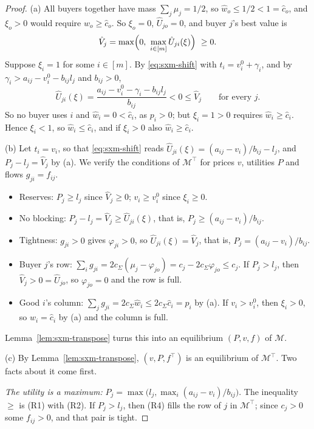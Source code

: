 \begin{proof}
(a) All buyers together have mass $\sum_j\mu_j=1/2$, so $\hat w_o\le1/2<1=\hat c_o$, and $\xi_o>0$ would
require $\hat w_o\ge\hat c_o$. So $\xi_o=0$, $\hat U_{jo}=0$, and buyer $j$'s best value is
\[
\hat V_j=\max\Bigl(0,\ \max_{i\in[m]}\hat U_{ji}(\xi)\Bigr)\ \ge0 .
\]
Suppose $\xi_i=1$ for some $i\in[m]$. By \eqref{eq:sxm-shift} with $t_i=v_i^0+\gamma_i$, and by
$\gamma_i>a_{ij}-v_i^0-b_{ij}l_j$ and $b_{ij}>0$,
\[
\hat U_{ji}(\xi)=\frac{a_{ij}-v_i^0-\gamma_i-b_{ij}l_j}{b_{ij}}<0\le\hat V_j\qquad\text{for every }j .
\]
So no buyer uses $i$ and $\hat w_i=0<\hat c_i$, as $p_i>0$; but $\xi_i=1>0$ requires
$\hat w_i\ge\hat c_i$. Hence $\xi_i<1$, so $\hat w_i\le\hat c_i$, and if $\xi_i>0$ also
$\hat w_i\ge\hat c_i$.

(b) Let $t_i=v_i$, so that \eqref{eq:sxm-shift} reads $\hat U_{ji}(\xi)=(a_{ij}-v_i)/b_{ij}-l_j$, and
$P_j-l_j=\hat V_j$ by (a). We verify the conditions of $\mathcal M^\top$ for prices $v$, utilities $P$
and flows $g_{ji}=f_{ij}$.
\begin{itemize}[nosep]
\item Reserves: $P_j\ge l_j$ since $\hat V_j\ge0$; $v_i\ge v_i^0$ since $\xi_i\ge0$.
\item No blocking: $P_j-l_j=\hat V_j\ge\hat U_{ji}(\xi)$, that is, $P_j\ge(a_{ij}-v_i)/b_{ij}$.
\item Tightness: $g_{ji}>0$ gives $\varphi_{ji}>0$, so $\hat U_{ji}(\xi)=\hat V_j$, that is,
$P_j=(a_{ij}-v_i)/b_{ij}$.
\item Buyer $j$'s row: $\sum_ig_{ji}=2c_\Sigma(\mu_j-\varphi_{jo})=c_j-2c_\Sigma\varphi_{jo}\le c_j$. If
$P_j>l_j$, then $\hat V_j>0=\hat U_{jo}$, so $\varphi_{jo}=0$ and the row is full.
\item Good $i$'s column: $\sum_jg_{ji}=2c_\Sigma\hat w_i\le2c_\Sigma\hat c_i=p_i$ by (a). If
$v_i>v_i^0$, then $\xi_i>0$, so $\hat w_i=\hat c_i$ by (a) and the column is full.
\end{itemize}
Lemma~\ref{lem:sxm-transpose} turns this into an equilibrium $(P,v,f)$ of $\mathcal M$.

(c) By Lemma~\ref{lem:sxm-transpose}, $(v,P,f^\top)$ is an equilibrium of $\mathcal M^\top$. Two facts
about it come first.

\emph{The utility is a maximum:} $P_j=\max\bigl(l_j,\max_i(a_{ij}-v_i)/b_{ij}\bigr)$. The inequality
$\ge$ is (R1) with (R2). If $P_j>l_j$, then (R4) fills the row of $j$ in $\mathcal M^\top$; since
$c_j>0$ some $f_{ij}>0$, and that pair is tight.


\end{proof}
